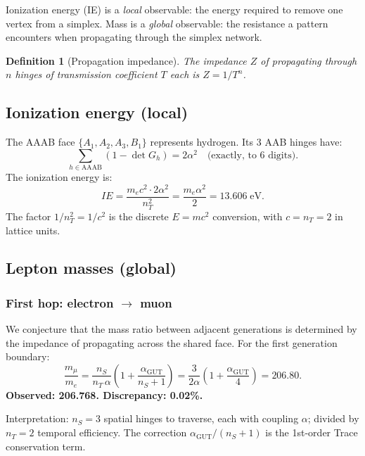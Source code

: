\documentclass[12pt,a4paper]{article}
\newtheorem{definition}[theorem]{Definition}
\newcommand{\agut}{\alpha_{\mathrm{GUT}}}
\newcommand{\nS}{n_S}
\newcommand{\nT}{n_T}
\begin{document}
Ionization energy (IE) is a \emph{local} observable: the energy
required to remove one vertex from a simplex.
Mass is a \emph{global} observable: the resistance a pattern
encounters when propagating through the simplex network.

\begin{definition}[Propagation impedance]
The impedance $Z$ of propagating through $n$ hinges of
transmission coefficient $T$ each is $Z = 1/T^n$.
\end{definition}

\subsection{Ionization energy (local)}

The AAAB face $\{A_1,A_2,A_3,B_1\}$ represents hydrogen.
Its 3 AAB hinges have:
\begin{equation}
\sum_{h \in \mathrm{AAAB}} (1 - \det G_h) = 2\alpha^2
\quad \text{(exactly, to 6 digits).}
\end{equation}
The ionization energy is:
\begin{equation}
\boxed{IE = \frac{m_e c^2 \cdot 2\alpha^2}{\nT^2}
= \frac{m_e\alpha^2}{2} = 13.606\;\mathrm{eV}.}
\end{equation}
The factor $1/\nT^2 = 1/c^2$ is the discrete $E = mc^2$ conversion,
with $c = \nT = 2$ in lattice units.

\subsection{Lepton masses (global)}

\subsubsection{First hop: electron $\to$ muon}

We conjecture that the mass ratio between adjacent generations
is determined by the impedance of propagating across the shared
face.  For the first generation boundary:
\begin{equation}
\frac{m_\mu}{m_e} = \frac{\nS}{\nT\,\alpha}
\left(1 + \frac{\agut}{\nS+1}\right)
= \frac{3}{2\alpha}\left(1 + \frac{\agut}{4}\right)
= 206.80.
\end{equation}
\textbf{Observed: 206.768.  Discrepancy: 0.02\%.}

Interpretation: $\nS = 3$ spatial hinges to traverse,
each with coupling $\alpha$; divided by $\nT = 2$ temporal
efficiency.  The correction $\agut/(\nS+1)$ is the 1st-order
Trace conservation term.
\end{document}
